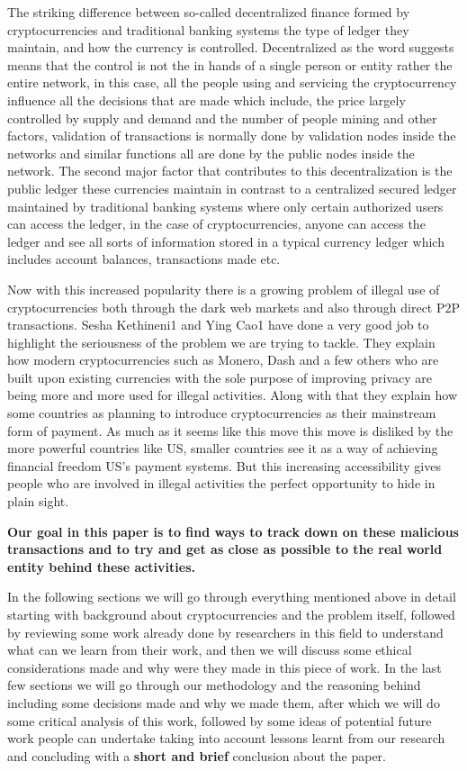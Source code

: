 \documentclass{article}
\begin{document}
    The striking difference between so-called decentralized finance\cite{zetzsche_arner_buckley_2020} formed by cryptocurrencies and traditional banking systems the type of ledger they maintain, and how the currency is controlled. Decentralized as the word suggests means that the control is not the in hands of a single person or entity rather the entire network, in this case, all the people using and servicing the cryptocurrency influence all the decisions that are made which include, the price largely controlled by supply and demand and the number of people mining and other factors, validation of transactions is normally done by validation nodes inside the networks and similar functions all are done by the public nodes inside the network. The second major factor that contributes to this decentralization is the public ledger these currencies maintain in contrast to a centralized secured ledger maintained by traditional banking systems where only certain authorized users can access the ledger, in the case of cryptocurrencies, anyone can access the ledger and see all sorts of information stored in a typical currency ledger which includes account balances, transactions made etc. 

    Now with this increased popularity there is a growing problem of illegal use of cryptocurrencies both through the dark web markets and also through direct P2P transactions. Sesha Kethineni1 and Ying Cao1 \cite{kethineni_cao_2019} have done a very good job to highlight the seriousness of the problem we are trying to tackle. They explain how modern cryptocurrencies such as Monero\cite{getmonero.org}, Dash\cite{dash_2022} and a few others who are built upon existing currencies with the sole purpose of improving privacy are being more and more used for illegal activities. Along with that they explain how some countries as planning to introduce cryptocurrencies as their mainstream form of payment. As much as it seems like this move this move is disliked by the more powerful countries like US, smaller countries see it as a way of achieving financial freedom US's payment systems. But this increasing accessibility gives people who are involved in illegal activities the perfect opportunity to hide in plain sight. 


    \textbf{Our goal in this paper is to find ways to track down on these malicious transactions and to try and get as close as possible to the real world entity behind these activities.}

    In the following sections we will go through everything mentioned above in detail starting with background about cryptocurrencies and the problem itself, followed by reviewing some work already done by researchers in this field to understand what can we learn from their work, and then we will discuss some ethical considerations made and why were they made in this piece of work. In the last few sections we will go through our methodology and the reasoning behind including some decisions made and why we made them, after which we will do some critical analysis of this work, followed by some ideas of potential future work people can undertake taking into account lessons learnt from our research and concluding with a \textbf{short and brief} conclusion about the paper.
\end{document}
